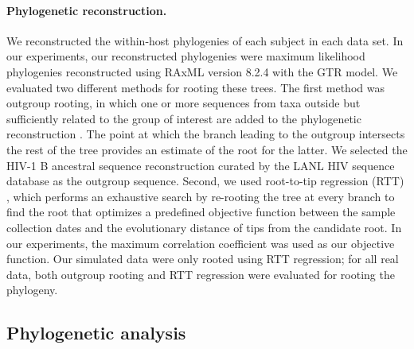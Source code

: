 \documentclass[12pt]{article}
\begin{document}

\paragraph {Phylogenetic reconstruction.} \label{subsec:phylo}
We reconstructed the within-host phylogenies of each subject in each data set.
In our experiments, our reconstructed phylogenies were maximum likelihood phylogenies reconstructed using RAxML version 8.2.4 \cite{Raxml14} with the GTR model.
We evaluated two different methods for rooting these trees. 
The first method was outgroup rooting, in which one or more sequences from taxa outside but sufficiently related to the group of interest are added to the phylogenetic reconstruction \cite{Huelsenbeck02}.
The point at which the branch leading to the outgroup intersects the rest of the tree provides an estimate of the root for the latter.
We selected the HIV-1 B ancestral sequence reconstruction curated by the LANL HIV sequence database \cite{LosAlamos} as the outgroup sequence.
Second, we used root-to-tip regression (RTT) \cite{Korber00}, which performs an exhaustive search by re-rooting the tree at every branch to find the root that optimizes a predefined objective function between the sample collection dates and the evolutionary distance of tips from the candidate root.
In our experiments, the maximum correlation coefficient was used as our objective function.
Our simulated data were only rooted using RTT regression; for all real data, both outgroup rooting and RTT regression were evaluated for rooting the phylogeny.


\subsection * {Phylogenetic analysis}
\end{document}
